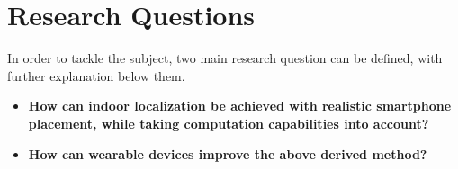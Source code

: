  




\section{Research Questions}

In order to tackle the subject, two main research question can be defined, with further explanation below them.

\begin{itemize}
	\item \textbf{How can indoor localization be achieved with realistic smartphone placement, while taking computation capabilities into account?}
	\item\textbf{How can wearable devices improve the above derived method?}
\end{itemize}

